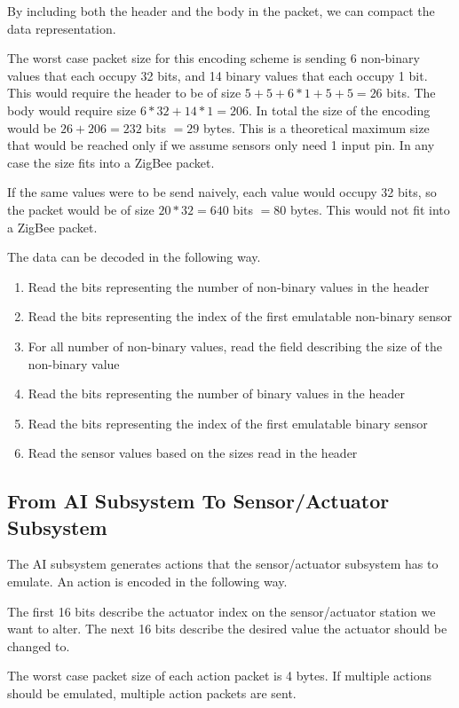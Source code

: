 By including both the header and the body in the packet, we can compact the data representation.

The worst case packet size for this encoding scheme is sending 6 non-binary values that each occupy 32 bits, and 14 binary values that each occupy 1 bit. This would require the header to be of size $5 + 5 + 6 * 1 + 5 + 5 = 26$ bits. The body would require size $6 * 32 + 14 * 1 = 206$. In total the size of the encoding would be $26 + 206 = 232$ bits $= 29$ bytes. This is a theoretical maximum size that would be reached only if we assume sensors only need 1 input pin. In any case the size fits into a ZigBee packet.

If the same values were to be send naively, each value would occupy 32 bits, so the packet would be of size $20 * 32 = 640$ bits $=80$ bytes. This would not fit into a ZigBee packet.

The data can be decoded in the following way.

\begin{enumerate}
\item Read the bits representing the number of non-binary values in the header
\item Read the bits representing the index of the first emulatable non-binary sensor
\item For all number of non-binary values, read the field describing the size of the non-binary value
\item Read the bits representing the number of binary values in the header
\item Read the bits representing the index of the first emulatable binary sensor
\item Read the sensor values based on the sizes read in the header
\end{enumerate}

\subsection{From  AI Subsystem To Sensor/Actuator Subsystem}

The AI subsystem generates actions that the sensor/actuator subsystem has to emulate. An action is encoded in the following way.

The first 16 bits describe the actuator index on the sensor/actuator station we want to alter. The next 16 bits describe the desired value the actuator should be changed to.

The worst case packet size of each action packet is 4 bytes. If multiple actions should be emulated, multiple action packets are sent.
